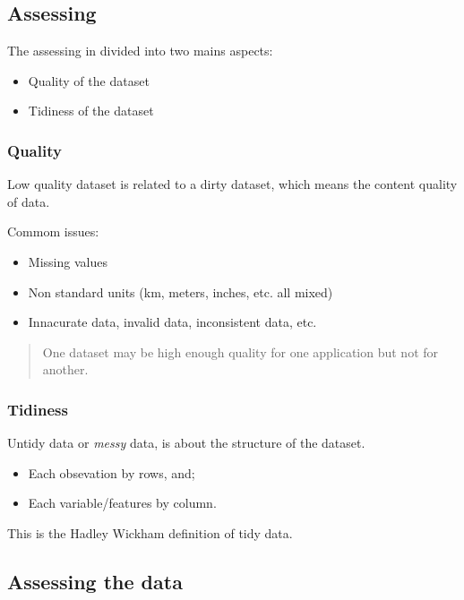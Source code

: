 \documentclass[]{book}
\providecommand{\tightlist}{%
  \setlength{\itemsep}{0pt}\setlength{\parskip}{0pt}}
\begin{document}
\subsection{Assessing}\label{assessing}

The assessing in divided into two mains aspects:

\begin{itemize}
\tightlist
\item
  Quality of the dataset
\item
  Tidiness of the dataset
\end{itemize}

\subsubsection{Quality}\label{quality}

Low quality dataset is related to a dirty dataset, which means the
content quality of data.

Commom issues:

\begin{itemize}
\tightlist
\item
  Missing values
\item
  Non standard units (km, meters, inches, etc. all mixed)
\item
  Innacurate data, invalid data, inconsistent data, etc.
\end{itemize}

\begin{quote}
One dataset may be high enough quality for one application but not for
another.
\end{quote}

\subsubsection{Tidiness}\label{tidiness}

Untidy data or \emph{messy} data, is about the structure of the dataset.

\begin{itemize}
\tightlist
\item
  Each obsevation by rows, and;
\item
  Each variable/features by column.
\end{itemize}

This is the Hadley Wickham definition of tidy data.

\subsection{Assessing the data}\label{assessing-the-data}
\end{document}
